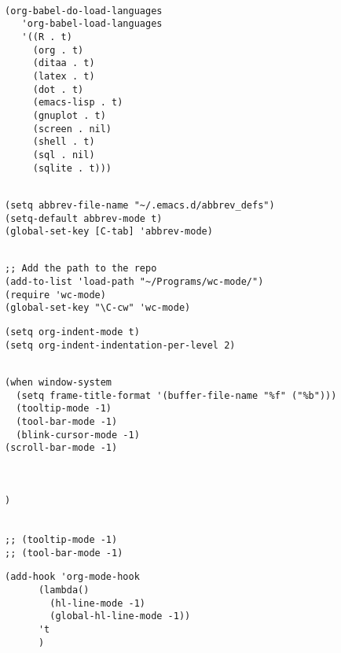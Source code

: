 \documentclass[11pt]{article}
\begin{document}
\label{sec:org14c46eb}

\begin{verbatim}

(org-babel-do-load-languages
   'org-babel-load-languages
   '((R . t)
     (org . t)
     (ditaa . t)
     (latex . t)
     (dot . t)
     (emacs-lisp . t)
     (gnuplot . t)
     (screen . nil)
     (shell . t)
     (sql . nil)
     (sqlite . t)))

\end{verbatim}

\label{sec:orge8e6ba4}

\begin{verbatim}

(setq abbrev-file-name "~/.emacs.d/abbrev_defs")
(setq-default abbrev-mode t)
(global-set-key [C-tab] 'abbrev-mode)

\end{verbatim}

\label{sec:org837bc8f}

\begin{verbatim}

;; Add the path to the repo
(add-to-list 'load-path "~/Programs/wc-mode/")
(require 'wc-mode)
(global-set-key "\C-cw" 'wc-mode)

\end{verbatim}

\label{sec:org6cb316a}

\begin{verbatim}
(setq org-indent-mode t)
(setq org-indent-indentation-per-level 2)

\end{verbatim}
\label{sec:org99e2aee}


\begin{verbatim}

(when window-system
  (setq frame-title-format '(buffer-file-name "%f" ("%b")))
  (tooltip-mode -1)
  (tool-bar-mode -1)
  (blink-cursor-mode -1)
(scroll-bar-mode -1)



)


;; (tooltip-mode -1)
;; (tool-bar-mode -1)
\end{verbatim}
\label{sec:org3fa36ea}
\begin{verbatim}
(add-hook 'org-mode-hook
	  (lambda()
	    (hl-line-mode -1)
	    (global-hl-line-mode -1))
	  't
	  )
\end{verbatim}
\end{document}
